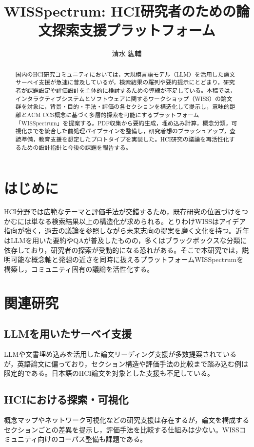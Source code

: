 \documentclass[twoside]{wiss}
\begin{document}
\title{WISSpectrum: HCI研究者のための論文探索支援プラットフォーム}
\author{清水 紘輔}

\begin{abstract}
国内のHCI研究コミュニティにおいては，大規模言語モデル（LLM）を活用した論文サーベイ支援が急速に普及しているが，検索結果の羅列や要約提示にとどまり，研究者が課題設定や評価設計を主体的に検討するための導線が不足している。本稿では，インタラクティブシステムとソフトウェアに関するワークショップ（WISS）の論文群を対象に，背景・目的・手法・評価の各セクションを構造化して提示し，意味的距離とACM CCS概念に基づく多層的探索を可能にするプラットフォーム「WISSpectrum」を提案する。PDF収集から要約生成，埋め込み計算，概念分類，可視化までを統合した前処理パイプラインを整備し，研究着想のブラッシュアップ，査読準備，教育支援を想定したプロトタイプを実装した。HCI研究の議論を再活性化するための設計指針と今後の課題を報告する。
\end{abstract}

\maketitle

\section{はじめに}
HCI分野では広範なテーマと評価手法が交錯するため，既存研究の位置づけをつかむには単なる検索結果以上の構造化が求められる。とりわけWISSはアイデア指向が強く，過去の議論を参照しながら未来志向の提案を磨く文化を持つ。近年はLLMを用いた要約やQAが普及したものの，多くはブラックボックスな分類に依存しており，研究者の探索が受動的になる恐れがある。そこで本研究では，説明可能な概念軸と発想の近さを同時に扱えるプラットフォームWISSpectrumを構築し，コミュニティ固有の議論を活性化する。

\section{関連研究}
\subsection{LLMを用いたサーベイ支援}
LLMや文書埋め込みを活用した論文リーディング支援が多数提案されているが，英語論文に偏っており，セクション構造や評価手法の比較まで踏み込む例は限定的である。日本語のHCI論文を対象とした支援も不足している。

\subsection{HCIにおける探索・可視化}
概念マップやネットワーク可視化などの研究支援は存在するが，論文を構成するセクションごとの差異を提示し，評価手法を比較する仕組みは少ない。WISSコミュニティ向けのコーパス整備も課題である。
\end{document}
